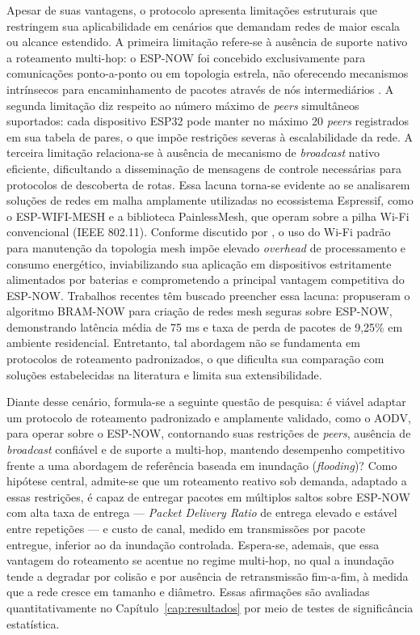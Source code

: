 Apesar de suas vantagens, o protocolo apresenta limitações estruturais
que restringem sua aplicabilidade em cenários que demandam redes de
maior escala ou alcance estendido. A primeira limitação refere-se à
ausência de suporte nativo a roteamento multi-hop: o ESP-NOW foi
concebido exclusivamente para comunicações ponto-a-ponto ou em topologia
estrela, não oferecendo mecanismos intrínsecos para encaminhamento de
pacotes através de nós intermediários \cite{becker2025}. A segunda
limitação diz respeito ao número máximo de \emph{peers} simultâneos
suportados: cada dispositivo ESP32 pode manter no máximo 20 \emph{peers}
registrados em sua tabela de pares, o que impõe restrições severas à
escalabilidade da rede. A terceira limitação relaciona-se à ausência de
mecanismo de \emph{broadcast} nativo eficiente, dificultando a
disseminação de mensagens de controle necessárias para protocolos de
descoberta de rotas. Essa lacuna torna-se evidente ao se analisarem
soluções de redes em malha amplamente utilizadas no ecossistema
Espressif, como o ESP-WIFI-MESH e a biblioteca PainlessMesh, que operam
sobre a pilha Wi-Fi convencional (IEEE 802.11). Conforme discutido por
, o uso do Wi-Fi padrão para manutenção da
topologia mesh impõe elevado \emph{overhead} de processamento e consumo
energético, inviabilizando sua aplicação em dispositivos estritamente
alimentados por baterias e comprometendo a principal vantagem
competitiva do ESP-NOW. Trabalhos recentes têm buscado preencher essa
lacuna:  propuseram o algoritmo BRAM-NOW para
criação de redes mesh seguras sobre ESP-NOW, demonstrando latência média
de 75 ms e taxa de perda de pacotes de 9,25\% em ambiente residencial.
Entretanto, tal abordagem não se fundamenta em protocolos de roteamento
padronizados, o que dificulta sua comparação com soluções estabelecidas
na literatura e limita sua extensibilidade.

Diante desse cenário, formula-se a seguinte questão de pesquisa: é
viável adaptar um protocolo de roteamento padronizado e amplamente
validado, como o AODV, para operar sobre o ESP-NOW, contornando suas
restrições de \emph{peers}, ausência de \emph{broadcast} confiável e de
suporte a multi-hop, mantendo desempenho competitivo frente a uma
abordagem de referência baseada em inundação (\emph{flooding})? Como
hipótese central, admite-se que um roteamento reativo sob demanda,
adaptado a essas restrições, é capaz de entregar pacotes em múltiplos
saltos sobre ESP-NOW com alta taxa de entrega --- \emph{Packet Delivery
Ratio} de entrega elevado e estável entre repetições --- e custo de
canal, medido em transmissões por pacote entregue, inferior ao da
inundação controlada. Espera-se, ademais, que essa vantagem do roteamento
se acentue no regime multi-hop, no qual a inundação tende a degradar por
colisão e por ausência de retransmissão fim-a-fim, à medida que a rede
cresce em tamanho e diâmetro. Essas afirmações são avaliadas
quantitativamente no Capítulo~\ref{cap:resultados} por meio de testes de
significância estatística.

